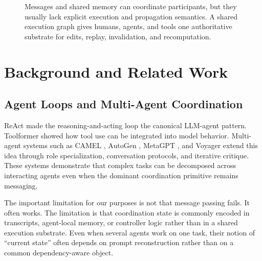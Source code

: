 \documentclass{article}
\begin{document}
\begin{figure}[t]
\caption{Messages and shared memory can coordinate participants, but they usually lack explicit execution and propagation semantics. A shared execution graph gives humans, agents, and tools one authoritative substrate for edits, replay, invalidation, and recomputation.}
\label{fig:collaboration-contrast}
\end{figure}

\section{Background and Related Work}

\subsection{Agent Loops and Multi-Agent Coordination}

ReAct \cite{yao2023react} made the reasoning-and-acting loop the canonical LLM-agent pattern. Toolformer \cite{schick2023toolformer} showed how tool use can be integrated into model behavior. Multi-agent systems such as CAMEL \cite{li2023camel}, AutoGen \cite{wu2023autogen}, MetaGPT \cite{hong2023metagpt}, and Voyager \cite{wang2023voyager} extend this idea through role specialization, conversation protocols, and iterative critique. These systems demonstrate that complex tasks can be decomposed across interacting agents even when the dominant coordination primitive remains messaging.

The important limitation for our purposes is not that message passing fails. It often works. The limitation is that coordination state is commonly encoded in transcripts, agent-local memory, or controller logic rather than in a shared execution substrate. Even when several agents work on one task, their notion of ``current state'' often depends on prompt reconstruction rather than on a common dependency-aware object.
\end{document}
